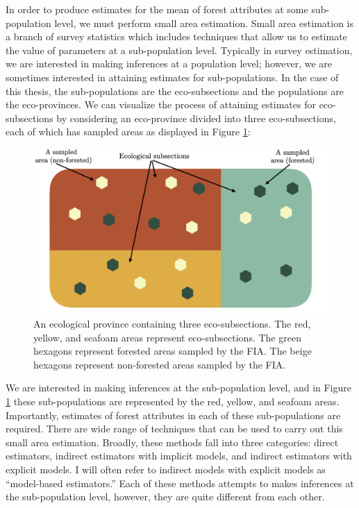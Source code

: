\documentclass[12pt,twoside]{reedthesis}
\begin{document}
In order to produce estimates for the mean of forest attributes at some sub-population level, we must perform small area estimation. Small area estimation is a branch of survey statistics which includes techniques that allow us to estimate the value of parameters at a sub-population level. Typically in survey estimation, we are interested in making inferences at a population level; however, we are sometimes interested in attaining estimates for sub-populations. In the case of this thesis, the sub-populations are the eco-subsections and the populations are the eco-provinces. We can visualize the process of attaining estimates for eco-subsections by considering an eco-province divided into three eco-subsections, each of which has sampled areas as displayed in Figure \ref{fig:ecological-province-diagram}:
\begin{figure}

{\centering \includegraphics[width=1\linewidth]{figure/ecoprov-diagram} 

}

\caption[An ecological province]{An ecological province containing three eco-subsections. The red, yellow, and seafoam areas represent eco-subsections. The green hexagons represent forested areas sampled by the FIA. The beige hexagons represent non-forested areas sampled by the FIA.}\label{fig:ecological-province-diagram}
\end{figure}
We are interested in making inferences at the sub-population level, and in Figure \ref{fig:ecological-province-diagram} these sub-populations are represented by the red, yellow, and seafoam areas. Importantly, estimates of forest attributes in each of these sub-populations are required. There are wide range of techniques that can be used to carry out this small area estimation. Broadly, these methods fall into three categories: direct estimators, indirect estimators with implicit models, and indirect estimators with explicit models. I will often refer to indirect models with explicit models as ``model-based estimators.'' Each of these methods attempts to makes inferences at the sub-population level, however, they are quite different from each other.
\end{document}
